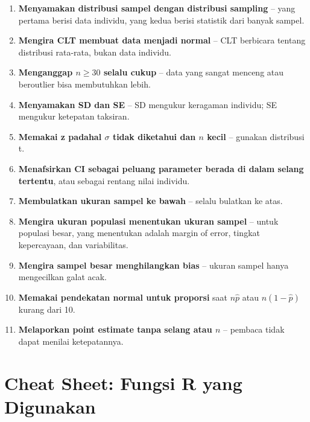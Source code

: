 \documentclass[
  indonesian,
  letterpaper,
]{book}
\providecommand{\tightlist}{%
  \setlength{\itemsep}{0pt}\setlength{\parskip}{0pt}}
\begin{document}
\begin{enumerate}
\def\labelenumi{\arabic{enumi}.}
\tightlist
\item
  \textbf{Menyamakan distribusi sampel dengan distribusi sampling} --
  yang pertama berisi data individu, yang kedua berisi statistik dari
  banyak sampel.
\item
  \textbf{Mengira CLT membuat data menjadi normal} -- CLT berbicara
  tentang distribusi rata-rata, bukan data individu.
\item
  \textbf{Menganggap \(n \geq 30\) selalu cukup} -- data yang sangat
  menceng atau beroutlier bisa membutuhkan lebih.
\item
  \textbf{Menyamakan SD dan SE} -- SD mengukur keragaman individu; SE
  mengukur ketepatan taksiran.
\item
  \textbf{Memakai z padahal \(\sigma\) tidak diketahui dan \(n\) kecil}
  -- gunakan distribusi t.
\item
  \textbf{Menafsirkan CI sebagai peluang parameter berada di dalam
  selang tertentu}, atau sebagai rentang nilai individu.
\item
  \textbf{Membulatkan ukuran sampel ke bawah} -- selalu bulatkan ke
  atas.
\item
  \textbf{Mengira ukuran populasi menentukan ukuran sampel} -- untuk
  populasi besar, yang menentukan adalah margin of error, tingkat
  kepercayaan, dan variabilitas.
\item
  \textbf{Mengira sampel besar menghilangkan bias} -- ukuran sampel
  hanya mengecilkan galat acak.
\item
  \textbf{Memakai pendekatan normal untuk proporsi} saat \(n\hat{p}\)
  atau \(n(1-\hat{p})\) kurang dari 10.
\item
  \textbf{Melaporkan point estimate tanpa selang atau \(n\)} -- pembaca
  tidak dapat menilai ketepatannya.
\end{enumerate}

\section{Cheat Sheet: Fungsi R yang
Digunakan}\label{cheat-sheet-fungsi-r-yang-digunakan}
\end{document}
